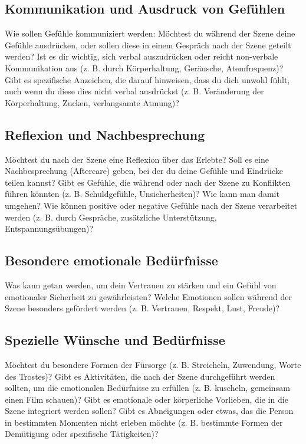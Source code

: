 \documentclass[a4paper,12pt]{article}
\begin{document}
\subsection{Kommunikation und Ausdruck von Gefühlen}
\noindent Wie sollen Gefühle kommuniziert werden: Möchtest du während der Szene deine Gefühle ausdrücken, oder sollen diese in einem Gespräch nach der Szene geteilt werden? Ist es dir wichtig, sich verbal auszudrücken oder reicht non-verbale Kommunikation aus (z. B. durch Körperhaltung, Geräusche, Atemfrequenz)? Gibt es spezifische Anzeichen, die darauf hinweisen, dass du dich unwohl fühlt, auch wenn du diese dies nicht verbal ausdrückst (z. B. Veränderung der Körperhaltung, Zucken, verlangsamte Atmung)?\newline
\noindent \TextField[name=WahrKomm,multiline=true,height=30em, width=37em]{}

\subsection{Reflexion und Nachbesprechung}
\noindent Möchtest du nach der Szene eine Reflexion über das Erlebte? Soll es eine Nachbesprechung (Aftercare) geben, bei der du deine Gefühle und Eindrücke teilen kannst? Gibt es Gefühle, die während oder nach der Szene zu Konflikten führen könnten (z. B. Schuldgefühle, Unsicherheiten)? Wie kann man damit umgehen? Wie können positive oder negative Gefühle nach der Szene verarbeitet werden (z. B. durch Gespräche, zusätzliche Unterstützung, Entspannungsübungen)? \newline
\noindent \TextField[name=WahrReflex,multiline=true,height=20em, width=37em]{}

\subsection{Besondere emotionale Bedürfnisse}
\noindent Was kann getan werden, um dein Vertrauen zu stärken und ein Gefühl von emotionaler Sicherheit zu gewährleisten? Welche Emotionen sollen während der Szene besonders gefördert werden (z. B. Vertrauen, Respekt, Lust, Freude)?\newline
\noindent \TextField[name=WahrBeson,multiline=true,height=10em, width=37em]{}

\newpage 

\subsection{Spezielle Wünsche und Bedürfnisse}
\noindent Möchtest du besondere Formen der Fürsorge (z. B. Streicheln, Zuwendung, Worte des Trostes)? Gibt es Aktivitäten, die nach der Szene durchgeführt werden sollten, um die emotionalen Bedürfnisse zu erfüllen (z. B. kuscheln, gemeinsam einen Film schauen)? Gibt es emotionale oder körperliche Vorlieben, die in die Szene integriert werden sollen? Gibt es Abneigungen oder etwas, das die Person in bestimmten Momenten nicht erleben möchte (z. B. bestimmte Formen der Demütigung oder spezifische Tätigkeiten)?
\noindent \TextField[name=WahrWuenSpez,multiline=true,height=10em, width=37em]{}
\end{document}
